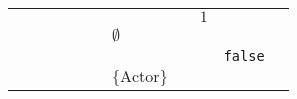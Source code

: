 \begin{table}[]
\begin{tabular}{lllllllllll}
                          &                           &                   &                                                               &                                                                                                                 &                           &                                                             &                                                                            & \cellcolor[HTML]{FC8D59}$1$                                                              &                                        &                                                                                                                 \\
                          &                           &                   &                                                               &                                                                                                                 &                           & \cellcolor[HTML]{FC8D59}$\emptyset$                         &                                                                            &                                                                                          &                                        &                                                                                                                 \\
                          &                           &                   &                                                               &                                                                                                                 &                           &                                                             &                                                                            &                                                                                          & \cellcolor[HTML]{FC8D59}\texttt{false} &                                                                                                                 \\
                          &                           &                   &                                                               &                                                                                                                 &                           & \cellcolor[HTML]{FC8D59}$\{\text{Actor}\}$                  &                                                                            &                                                                                          &                                        &                                                                                                                 \\

\end{tabular}
\end{table}
